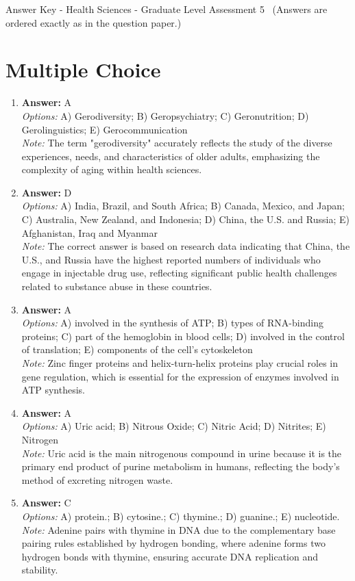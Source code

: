 \documentclass[12pt]{article}
\begin{document}
\begin{center}
Answer Key - Health Sciences - Graduate Level Assessment 5 \
\small (Answers are ordered exactly as in the question paper.)
\end{center}

\section*{Multiple Choice}
\begin{enumerate}[label=\arabic*.]
\item \textbf{Answer:} A
\\ \textit{Options:} A) Gerodiversity; B) Geropsychiatry; C) Geronutrition; D) Gerolinguistics; E) Gerocommunication
\\ \textit{Note:} The term "gerodiversity" accurately reflects the study of the diverse experiences, needs, and characteristics of older adults, emphasizing the complexity of aging within health sciences.
\item \textbf{Answer:} D
\\ \textit{Options:} A) India, Brazil, and South Africa; B) Canada, Mexico, and Japan; C) Australia, New Zealand, and Indonesia; D) China, the U.S. and Russia; E) Afghanistan, Iraq and Myanmar
\\ \textit{Note:} The correct answer is based on research data indicating that China, the U.S., and Russia have the highest reported numbers of individuals who engage in injectable drug use, reflecting significant public health challenges related to substance abuse in these countries.
\item \textbf{Answer:} A
\\ \textit{Options:} A) involved in the synthesis of ATP; B) types of RNA-binding proteins; C) part of the hemoglobin in blood cells; D) involved in the control of translation; E) components of the cell's cytoskeleton
\\ \textit{Note:} Zinc finger proteins and helix-turn-helix proteins play crucial roles in gene regulation, which is essential for the expression of enzymes involved in ATP synthesis.
\item \textbf{Answer:} A
\\ \textit{Options:} A) Uric acid; B) Nitrous Oxide; C) Nitric Acid; D) Nitrites; E) Nitrogen
\\ \textit{Note:} Uric acid is the main nitrogenous compound in urine because it is the primary end product of purine metabolism in humans, reflecting the body's method of excreting nitrogen waste.
\item \textbf{Answer:} C
\\ \textit{Options:} A) protein.; B) cytosine.; C) thymine.; D) guanine.; E) nucleotide.
\\ \textit{Note:} Adenine pairs with thymine in DNA due to the complementary base pairing rules established by hydrogen bonding, where adenine forms two hydrogen bonds with thymine, ensuring accurate DNA replication and stability.
\end{enumerate}
\end{document}
